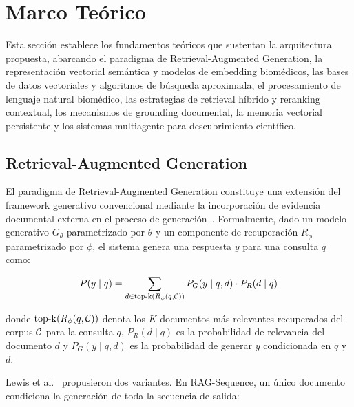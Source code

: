 
\section{Marco Teórico}
\label{sec:theoretical_framework}

Esta sección establece los fundamentos teóricos que sustentan la arquitectura propuesta, abarcando el paradigma de Retrieval-Augmented Generation, la representación vectorial semántica y modelos de embedding biomédicos, las bases de datos vectoriales y algoritmos de búsqueda aproximada, el procesamiento de lenguaje natural biomédico, las estrategias de retrieval híbrido y reranking contextual, los mecanismos de grounding documental, la memoria vectorial persistente y los sistemas multiagente para descubrimiento científico.

\subsection{Retrieval-Augmented Generation}
\label{subsec:tf_rag}

El paradigma de Retrieval-Augmented Generation constituye una extensión del framework generativo convencional mediante la incorporación de evidencia documental externa en el proceso de generación~\cite{lewis2020retrieval}. Formalmente, dado un modelo generativo $G_\theta$ parametrizado por $\theta$ y un componente de recuperación $R_\phi$ parametrizado por $\phi$, el sistema \rag{} genera una respuesta $y$ para una consulta $q$ como:

\begin{equation}
\label{eq:rag_general}
  P(y \mid q) = \sum_{d \in \operatorname{top\text{-}k}(R_\phi(q, \mathcal{C}))} P_G(y \mid q, d) \cdot P_R(d \mid q)
\end{equation}

\noindent donde $\operatorname{top\text{-}k}(R_\phi(q, \mathcal{C}))$ denota los $K$ documentos más relevantes recuperados del corpus $\mathcal{C}$ para la consulta $q$, $P_R(d \mid q)$ es la probabilidad de relevancia del documento $d$ y $P_G(y \mid q, d)$ es la probabilidad de generar $y$ condicionada en $q$ y $d$.

Lewis et al.~\cite{lewis2020retrieval} propusieron dos variantes. En RAG-Sequence, un único documento condiciona la generación de toda la secuencia de salida:

